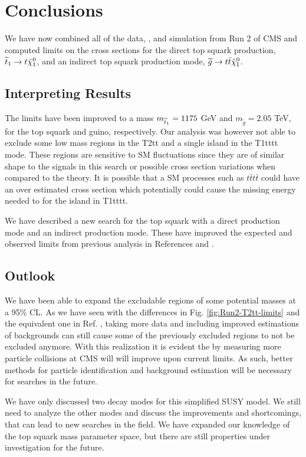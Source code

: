 \chapter{Conclusions}
\label{ch:Conclusions}

We have now combined all of the data, \datalumi{}, and simulation from Run 2 of CMS and computed limits on the cross sections for the direct top squark production, $\widetilde{t}_1\rightarrow t\tilde{\chi}^{0}_{1}$, and an indirect top squark production mode, $\widetilde{g}\rightarrow t \bar{t}\tilde{\chi}^{0}_{1}$. 

\section{Interpreting Results}
\label{sec:Interp}

The limits have been improved to a mass $m_{\widetilde{t}_1}=1175$ GeV and $m_{\widetilde{g}}=2.05$ TeV, for the top squark and guino, respectively. Our analysis was however not able to exclude some low mass regions in the T2tt and a single island in the T1tttt mode. These regions are sensitive to SM fluctuations since they are of similar shape to the signals in this search or possible cross section variations when compared to the theory. It is possible that a SM processes such as $t\bar{t}t\bar{t}$ could have an over estimated cross section which potentially could cause the missing energy needed to for the island in T1tttt. 

We have described a new search for the top squark with a direct production mode and an indirect production mode. These have improved the expected and observed limits from previous analysis in References \cite{sirunyan_search_2017} and \cite{cms_collaboration_search_2018}. 

\section{Outlook}
\label{sec:outlook}

We have been able to expand the excludable regions of some potential masses at a 95\% CL. As we have seen with the differences in Fig. \ref{fig:Run2-T2tt-limits} and the equivalent one in Ref. \cite{sirunyan_search_2017}, taking more data and including improved estimations of backgrounds can still cause some of the previously excluded regions to not be excluded anymore. With this realization it is evident the by measuring more particle collisions at CMS will will improve upon current limits. As such, better methods for particle identification and background estimation will be necessary for searches in the future. 

We have only discussed two decay modes for this simplified SUSY model. We still need to analyze the other modes and discuss the improvements and shortcomings, that can lead to new searches in the field. We have expanded our knowledge of the top squark mass parameter space, but there are still properties under investigation for the future.
